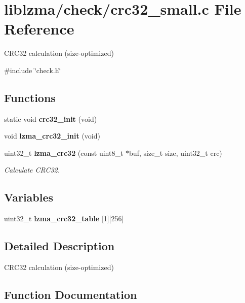 \section{liblzma/check/crc32\+\_\+small.c File Reference}
\label{crc32__small_8c}


C\+R\+C32 calculation (size-\/optimized)  


{\ttfamily \#include \char`\"{}check.\+h\char`\"{}}\newline
\subsection*{Functions}
\begin{DoxyCompactItemize}
\item 
\mbox{\label{crc32__small_8c_abe10d610947fad29dc7da8dd5c9102cd}} 
static void {\bfseries crc32\+\_\+init} (void)
\item 
\mbox{\label{crc32__small_8c_a2fe7980f21bc514b3ebf54930b04741a}} 
void {\bfseries lzma\+\_\+crc32\+\_\+init} (void)
\item 
uint32\+\_\+t \textbf{ lzma\+\_\+crc32} (const uint8\+\_\+t $\ast$buf, size\+\_\+t size, uint32\+\_\+t crc)
\begin{DoxyCompactList}\small\item\em Calculate C\+R\+C32. \end{DoxyCompactList}\end{DoxyCompactItemize}
\subsection*{Variables}
\begin{DoxyCompactItemize}
\item 
uint32\+\_\+t \textbf{ lzma\+\_\+crc32\+\_\+table} [1][256]
\end{DoxyCompactItemize}


\subsection{Detailed Description}
C\+R\+C32 calculation (size-\/optimized) 



\subsection{Function Documentation}
\mbox{\label{crc32__small_8c_a2e0f93b47fb4e0111c6c18b86a5eaff8}} 
